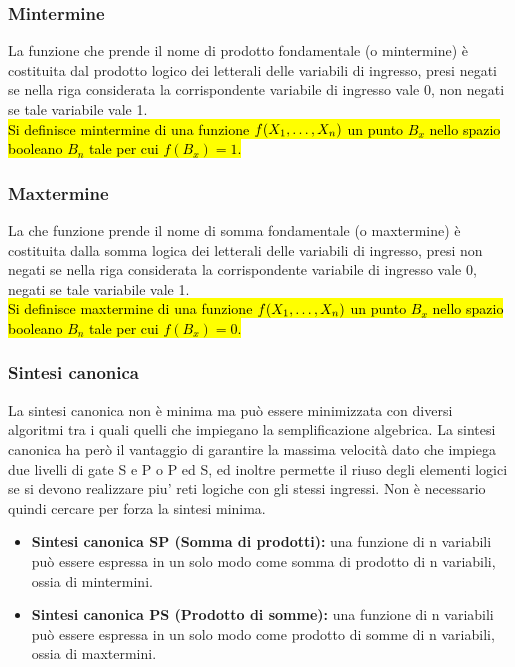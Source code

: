 \documentclass{article}
\begin{document}
\subsubsection{Mintermine}
La funzione che prende il nome di prodotto fondamentale (o mintermine) è costituita dal prodotto logico dei letterali delle variabili di ingresso, presi negati se nella riga considerata la corrispondente variabile di ingresso vale 0, non negati se tale variabile vale 1.
\\
\hl{Si definisce mintermine di una funzione $f(X_1, \space\dots, X_n)$ un punto $B_x$ nello spazio booleano $B_n$ tale per cui $f(B_x)=1$.}

\subsubsection{Maxtermine}
La che funzione prende il nome di somma fondamentale (o maxtermine) è costituita dalla somma logica dei letterali delle variabili di ingresso, presi non negati se nella riga considerata la corrispondente variabile di ingresso vale 0, negati se tale variabile vale 1. 
\\
\hl{Si definisce maxtermine di una funzione $f(X_1, \space\dots, X_n)$ un punto $B_x$ nello spazio booleano $B_n$ tale per cui $f(B_x)=0$.}

\subsubsection{Sintesi canonica}
La sintesi canonica non è minima ma può essere minimizzata con diversi algoritmi tra i quali quelli che impiegano la semplificazione algebrica.
La sintesi canonica ha però il vantaggio di garantire la massima velocità dato che impiega due livelli di gate S e P o P ed S, ed inoltre permette il riuso degli elementi logici se si devono realizzare piu’ reti logiche con gli stessi ingressi. Non è necessario quindi cercare per forza la sintesi minima.
\begin{itemize}
    \item \textbf{Sintesi canonica SP (Somma di prodotti):} una funzione di n variabili può essere espressa in un solo modo come somma di prodotto di n variabili, ossia di mintermini.
    \item \textbf{Sintesi canonica PS (Prodotto di somme):} una funzione di n variabili può essere espressa in un solo modo come prodotto di somme di n variabili, ossia di maxtermini.
\end{itemize}
\end{document}
